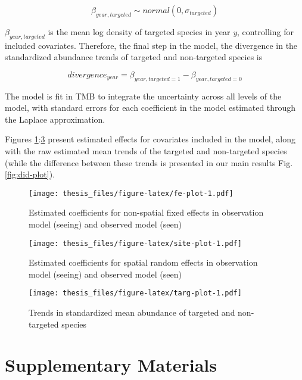 \documentclass[twoside,12pt,final]{ucthesis-CA2012}
\begin{document}
\begin{ucmainmatter}
\[\beta_{year,targeted} \sim normal(0,\sigma_{targeted})\]

\(\beta_{year,targeted}\) is the mean log density of targeted species in
year \emph{y}, controlling for included covariates. Therefore, the final
step in the model, the divergence in the standardized abundance trends
of targeted and non-targeted species is

\[divergence_{year} =  \beta_{year,targeted = 1} - \beta_{year,targeted = 0}\]

The model is fit in TMB to integrate the uncertainty across all levels
of the model, with standard errors for each coefficient in the model
estimated through the Laplace approximation.

Figures \ref{fig:fe-plot}:\ref{fig:targ-plot} present estimated effects
for covariates included in the model, along with the raw estimated mean
trends of the targeted and non-targeted species (while the difference
between these trends is presented in our main results
Fig.\ref{fig:did-plot}).
\begin{figure}
\centering
\texttt{[image: thesis\_files/figure-latex/fe-plot-1.pdf]}
\caption{\label{fig:fe-plot}Estimated coefficients for non-spatial fixed
effects in observation model (seeing) and observed model (seen)}
\end{figure}
\begin{figure}
\centering
\texttt{[image: thesis\_files/figure-latex/site-plot-1.pdf]}
\caption{\label{fig:site-plot}Estimated coefficients for spatial random
effects in observation model (seeing) and observed model (seen)}
\end{figure}
\begin{figure}
\centering
\texttt{[image: thesis\_files/figure-latex/targ-plot-1.pdf]}
\caption{\label{fig:targ-plot}Trends in standardized mean abundance of
targeted and non-targeted species}
\end{figure}
\section{Supplementary Materials}\label{supplementary-materials}


\end{ucmainmatter}
\end{document}
